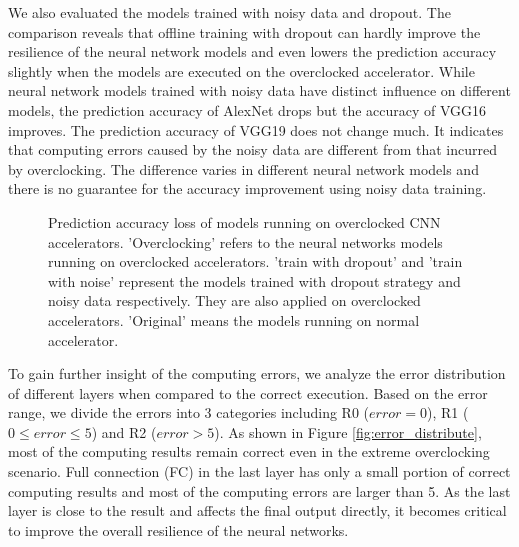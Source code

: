 We also evaluated the models trained with noisy data and dropout. 
The comparison reveals that offline training with dropout can hardly 
improve the resilience of the neural network models and even lowers the 
prediction accuracy slightly when the models are executed on the 
overclocked accelerator. While neural network models trained with 
noisy data have distinct influence on different models, the 
prediction accuracy of AlexNet drops but the accuracy of VGG16 
improves. The prediction accuracy of VGG19 does not change much.
It indicates that computing errors caused by the noisy data are 
different from that incurred by overclocking. The difference varies 
in different neural network models and there is no guarantee 
for the accuracy improvement using noisy data training.
\begin{figure}
        \center
        \qquad
        \caption{Prediction accuracy loss of models running on overclocked CNN accelerators.
			'Overclocking' refers to the neural networks models running on overclocked accelerators. 
'train with dropout' and 'train with noise' represent the models trained with dropout strategy 
and noisy data respectively. They are also applied on overclocked accelerators. 
'Original' means the models running on normal accelerator.
 }
 \vspace{-1em}
        \label{fig:accuracy-dropout-noisy}
\end{figure}

To gain further insight of the computing errors, we analyze the error distribution 
of different layers when compared to the correct execution. Based on the error range, 
we divide the errors into 3 categories including R0 ($error = 0$), 
R1 ($0 \leq error \leq 5$) and R2 ($error > 5$). As shown in 
Figure \ref{fig:error_distribute}, most of the computing results remain 
correct even in the extreme overclocking scenario. Full connection (FC) in the last layer 
has only a small portion of correct computing results and most of the computing errors are 
larger than 5. As the last layer is close to the result and affects the final output 
directly, it becomes critical to improve the overall resilience of the neural 
networks. 

\begin{figure*}
        \caption{Computing error distribution across the different layers}
        \label{fig:error_distribute}
\end{figure*}

